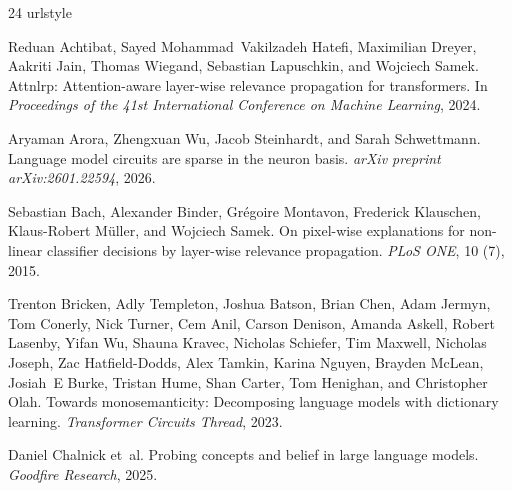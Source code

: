 \documentclass[11pt]{article}
\begin{document}
\begin{thebibliography}{24}
\providecommand{\natexlab}[1]{#1}
\providecommand{\url}[1]{\texttt{#1}}
\expandafter\ifx\csname urlstyle\endcsname\relax
  \providecommand{\doi}[1]{doi: #1}\else
  \providecommand{\doi}{doi: \begingroup \urlstyle{rm}\Url}\fi

Reduan Achtibat, Sayed Mohammad~Vakilzadeh Hatefi, Maximilian Dreyer, Aakriti
  Jain, Thomas Wiegand, Sebastian Lapuschkin, and Wojciech Samek.
\newblock Attnlrp: Attention-aware layer-wise relevance propagation for
  transformers.
\newblock In \emph{Proceedings of the 41st International Conference on Machine
  Learning}, 2024.

Aryaman Arora, Zhengxuan Wu, Jacob Steinhardt, and Sarah Schwettmann.
\newblock Language model circuits are sparse in the neuron basis.
\newblock \emph{arXiv preprint arXiv:2601.22594}, 2026.

Sebastian Bach, Alexander Binder, Gr{\'e}goire Montavon, Frederick Klauschen,
  Klaus-Robert M{\"u}ller, and Wojciech Samek.
\newblock On pixel-wise explanations for non-linear classifier decisions by
  layer-wise relevance propagation.
\newblock \emph{PLoS ONE}, 10 (7), 2015.

Trenton Bricken, Adly Templeton, Joshua Batson, Brian Chen, Adam Jermyn, Tom
  Conerly, Nick Turner, Cem Anil, Carson Denison, Amanda Askell, Robert
  Lasenby, Yifan Wu, Shauna Kravec, Nicholas Schiefer, Tim Maxwell, Nicholas
  Joseph, Zac Hatfield-Dodds, Alex Tamkin, Karina Nguyen, Brayden McLean,
  Josiah~E Burke, Tristan Hume, Shan Carter, Tom Henighan, and Christopher
  Olah.
\newblock Towards monosemanticity: Decomposing language models with dictionary
  learning.
\newblock \emph{Transformer Circuits Thread}, 2023.

Daniel Chalnick et~al.
\newblock Probing concepts and belief in large language models.
\newblock \emph{Goodfire Research}, 2025.


\end{thebibliography}
\end{document}
